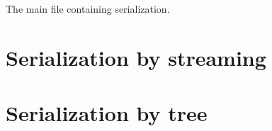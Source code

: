 The main file containing serialization.






\section{Serialization by streaming}



\section{Serialization by tree}
